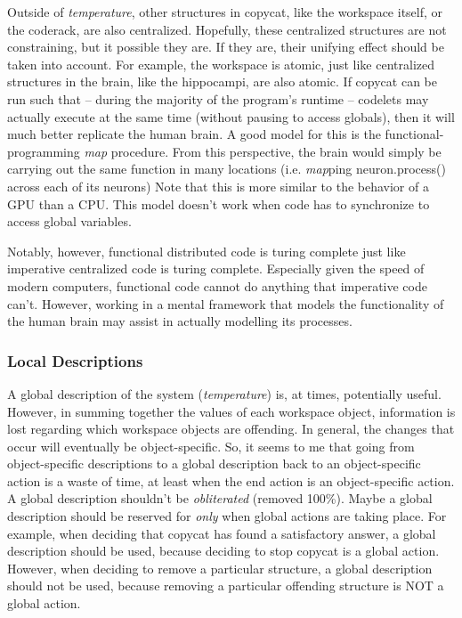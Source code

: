 \documentclass[a4paper]{article}
\begin{document}
    Outside of \emph{temperature}, other structures in copycat, like the workspace itself, or the coderack, are also centralized.
    Hopefully, these centralized structures are not constraining, but it possible they are.
    If they are, their unifying effect should be taken into account.
    For example, the workspace is atomic, just like centralized structures in the brain, like the hippocampi, are also atomic.
    If copycat can be run such that -- during the majority of the program's runtime -- codelets may actually execute at the same time (without pausing to access globals), then it will much better replicate the human brain.
    A good model for this is the functional-programming \emph{map} procedure.
    From this perspective, the brain would simply be carrying out the same function in many locations (i.e. \emph{map}ping neuron.process() across each of its neurons)
    Note that this is more similar to the behavior of a GPU than a CPU.
    This model doesn't work when code has to synchronize to access global variables.

    Notably, however, functional distributed code is turing complete just like imperative centralized code is turing complete.
    Especially given the speed of modern computers, functional code cannot do anything that imperative code can't.
    However, working in a mental framework that models the functionality of the human brain may assist in actually modelling its processes.

    \subsubsection{Local Descriptions}

    A global description of the system (\emph{temperature}) is, at times, potentially useful.
    However, in summing together the values of each workspace object, information is lost regarding which workspace objects are offending.
    In general, the changes that occur will eventually be object-specific.
    So, it seems to me that going from object-specific descriptions to a global description back to an object-specific action is a waste of time, at least when the end action is an object-specific action.
    A global description shouldn't be \emph{obliterated} (removed 100\%).
    Maybe a global description should be reserved for \emph{only} when global actions are taking place.
    For example, when deciding that copycat has found a satisfactory answer, a global description should be used, because deciding to stop copycat is a global action.
    However, when deciding to remove a particular structure, a global description should not be used, because removing a particular offending structure is NOT a global action.
\end{document}

